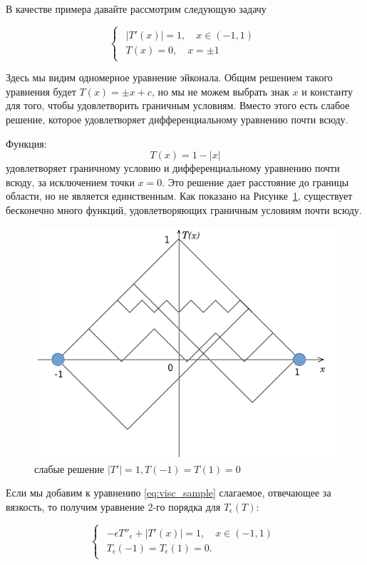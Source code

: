 В качестве примера давайте рассмотрим следующую задачу

\begin{equation}
  \label{eq:visc_sample}
  \begin{cases}
    \begin{array}{ll}
      |T'(x)| = 1,\quad x \in (-1,1) \\
      T(x) = 0,\quad x = \pm 1
    \end{array}
  \end{cases}
\end{equation}

Здесь мы видим одномерное уравнение эйконала. Общим решением такого
уравнения будет $T(x) = \pm x + c$, но мы не можем выбрать знак $x$ и
константу для того, чтобы удовлетворить граничным условиям. Вместо
этого есть слабое решение, которое удовлетворяет дифференциальному
уравнению почти всюду.

Функция:
\begin{equation*}
  T(x) = 1 - |x|
\end{equation*}
удовлетворяет граничному условию и дифференциальному уравнению почти
всюду, за исключением точки $x = 0$. Это решение дает расстояние до
границы области, но не является единственным. Как показано на
Рисунке~\ref{fig:weak-sol}, существует бесконечно много функций,
удовлетворяющих граничным условиям почти всюду.

\begin{figure}[h]
  \centering
  \includegraphics[width=0.5\linewidth]{img/weak-sol.png}
  \hfil \caption{слабые решение $|T'|=1,T(-1)=T(1)=0$}
  \label{fig:weak-sol}

\end{figure}

Если мы добавим к уравнению \eqref{eq:visc_sample} слагаемое,
отвечающее за вязкость, то получим уравнение 2-го порядка для
$T_\epsilon(T)$:

\begin{equation}
  \label{eq:visc_sample_2}
  \begin{cases}
    \begin{array}{ll}
      -\epsilon T''_\epsilon+|T'(x)| = 1,\quad x \in (-1,1) \\
      T_\epsilon(-1) = T_\epsilon(1) = 0.
    \end{array}
  \end{cases}
\end{equation}

